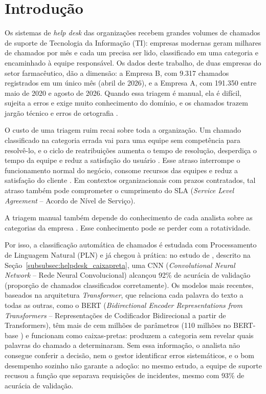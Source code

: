 \documentclass[
    12pt,                %
    openright,           %
    oneside,             %
    a4paper,             %
    english,             %
    brazil               %
]{abntex2}
\begin{document}
\chapter{Introdução}
\label{cap:introducao}

Os sistemas de \textit{help desk} das organizações recebem grandes volumes de chamados de suporte de Tecnologia da Informação (TI): empresas modernas geram milhares de chamados por mês \cite{razma2026} e cada um precisa ser lido, classificado em uma categoria e encaminhado à equipe responsável. Os dados deste trabalho, de duas empresas do setor farmacêutico, dão a dimensão: a Empresa B, com 9.317 chamados registrados em um único mês (abril de 2026), e a Empresa A, com 191.350 entre maio de 2020 e agosto de 2026. Quando essa triagem é manual, ela é difícil, sujeita a erros e exige muito conhecimento do domínio, e os chamados trazem jargão técnico e erros de ortografia \cite{zemp2021}.

O custo de uma triagem ruim recai sobre toda a organização. Um chamado classificado na categoria errada vai para uma equipe sem competência para resolvê-lo, e o ciclo de reatribuições aumenta o tempo de resolução, desperdiça o tempo da equipe e reduz a satisfação do usuário \cite{paramesh2022}. Esse atraso interrompe o funcionamento normal do negócio, consome recursos das equipes e reduz a satisfação do cliente \cite{paramesh2022}. Em contextos organizacionais com prazos contratados, tal atraso também pode comprometer o cumprimento do SLA (\textit{Service Level Agreement} -- Acordo de Nível de Serviço). 

A triagem manual também depende do conhecimento de cada analista sobre as categorias da empresa \cite{paramesh2022}. Esse conhecimento pode se perder com a rotatividade.

Por isso, a classificação automática de chamados é estudada com Processamento de Linguagem Natural (PLN) e já chegou à prática: no estudo de , descrito na Seção~\ref{subsubsec:helpdesk_caixapreta}, uma CNN (\textit{Convolutional Neural Network} -- Rede Neural Convolucional) alcançou 92\% de acurácia de validação (proporção de chamados classificados corretamente). Os modelos mais recentes, baseados na arquitetura \textit{Transformer}, que relaciona cada palavra do texto a todas as outras, como o BERT (\textit{Bidirectional Encoder Representations from Transformers} -- Representações de Codificador Bidirecional a partir de Transformers), têm mais de cem milhões de parâmetros (110 milhões no BERT-base \cite{devlin2019}) e funcionam como caixas-pretas: produzem a categoria sem revelar quais palavras do chamado a determinaram. Sem essa informação, o analista não consegue conferir a decisão, nem o gestor identificar erros sistemáticos, e o bom desempenho sozinho não garante a adoção: no mesmo estudo, a equipe de suporte recusou a função que separava requisições de incidentes, mesmo com 93\% de acurácia de validação.
\end{document}
